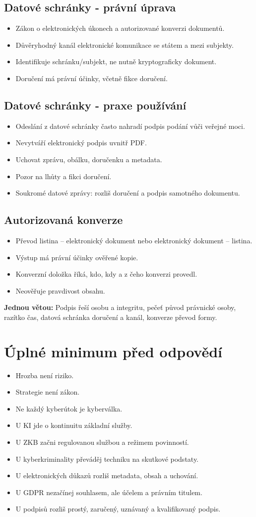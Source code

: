 \documentclass[10pt,a4paper]{article}
\newcommand{\blok}[1]{\subsection*{#1}}
\newcommand{\mini}[1]{\medskip\noindent\colorbox{blue!7}{\parbox{\dimexpr\linewidth-2\fboxsep}{\textbf{Jednou větou:} #1}}\par\medskip}
\begin{document}
\blok{Datové schránky - právní úprava}
\begin{itemize}
  \item Zákon o elektronických úkonech a autorizované konverzi dokumentů.
  \item Důvěryhodný kanál elektronické komunikace se státem a mezi subjekty.
  \item Identifikuje schránku/subjekt, ne nutně kryptograficky dokument.
  \item Doručení má právní účinky, včetně fikce doručení.
\end{itemize}

\blok{Datové schránky - praxe používání}
\begin{itemize}
  \item Odeslání z datové schránky často nahradí podpis podání vůči veřejné moci.
  \item Nevytváří elektronický podpis uvnitř PDF.
  \item Uchovat zprávu, obálku, doručenku a metadata.
  \item Pozor na lhůty a fikci doručení.
  \item Soukromé datové zprávy: rozliš doručení a podpis samotného dokumentu.
\end{itemize}

\blok{Autorizovaná konverze}
\begin{itemize}
  \item Převod listina -- elektronický dokument nebo elektronický dokument -- listina.
  \item Výstup má právní účinky ověřené kopie.
  \item Konverzní doložka říká, kdo, kdy a z čeho konverzi provedl.
  \item Neověřuje pravdivost obsahu.
\end{itemize}

\mini{Podpis řeší osobu a integritu, pečeť původ právnické osoby, razítko čas, datová schránka doručení a kanál, konverze převod formy.}

\newpage

\section*{Úplné minimum před odpovědí}
\begin{itemize}
  \item Hrozba není riziko.
  \item Strategie není zákon.
  \item Ne každý kyberútok je kyberválka.
  \item U KI jde o kontinuitu základní služby.
  \item U ZKB začni regulovanou službou a režimem povinností.
  \item U kyberkriminality převáděj techniku na skutkové podstaty.
  \item U elektronických důkazů rozliš metadata, obsah a uchování.
  \item U GDPR nezačínej souhlasem, ale účelem a právním titulem.
  \item U podpisů rozliš prostý, zaručený, uznávaný a kvalifikovaný podpis.
\end{itemize}
\end{document}
